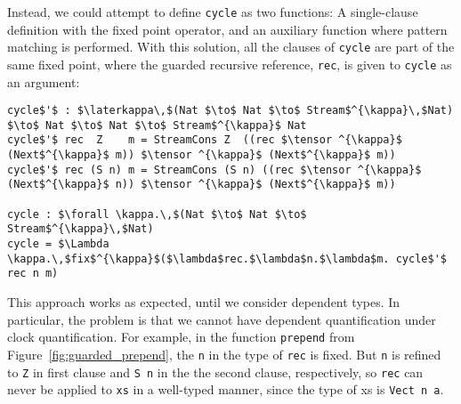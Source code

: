 Instead, we could attempt to define \texttt{cycle} as two functions: A
single-clause definition with the fixed point operator, and an auxiliary
function where pattern matching is performed. With this solution, all the clauses of
\texttt{cycle} are part of the same fixed point, where the guarded recursive reference,
\texttt{rec}, is given to \texttt{cycle} as an argument:

\begin{lstlisting}[mathescape]
cycle$'$ : $\laterkappa\,$(Nat $\to$ Nat $\to$ Stream$^{\kappa}\,$Nat) $\to$ Nat $\to$ Nat $\to$ Stream$^{\kappa}$ Nat
cycle$'$ rec  Z    m = StreamCons Z  ((rec $\tensor ^{\kappa}$ (Next$^{\kappa}$ m)) $\tensor ^{\kappa}$ (Next$^{\kappa}$ m))
cycle$'$ rec (S n) m = StreamCons (S n) ((rec $\tensor ^{\kappa}$ (Next$^{\kappa}$ n)) $\tensor ^{\kappa}$ (Next$^{\kappa}$ m))

cycle : $\forall \kappa.\,$(Nat $\to$ Nat $\to$ Stream$^{\kappa}\,$Nat)
cycle = $\Lambda \kappa.\,$fix$^{\kappa}$($\lambda$rec.$\lambda$n.$\lambda$m. cycle$'$ rec n m)
\end{lstlisting}



This approach works as expected, until we consider dependent types. In
particular, the problem is that we cannot have dependent quantification under
clock quantification. For example, in the function \texttt{prepend} from
Figure~\ref{fig:guarded_prepend}, the \texttt{n} in the type of \texttt{rec} is
fixed. But \texttt{n} is refined to \texttt{Z} in first clause and \texttt{S n}
in the the second clause, respectively, so \texttt{rec} can never be applied to
\texttt{xs} in a well-typed manner, since the type of xs is \texttt{Vect n a}.

